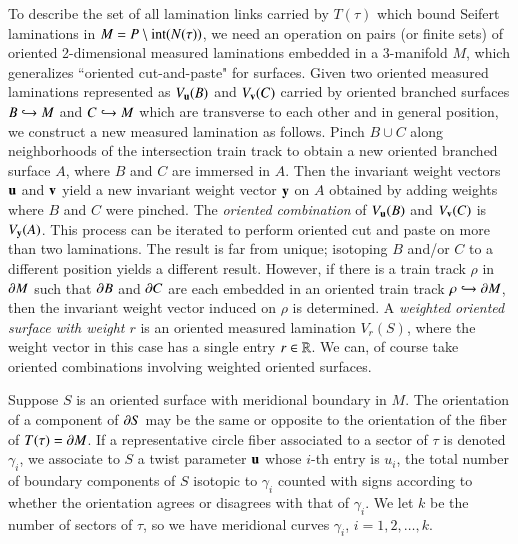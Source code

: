 \documentclass[12pt]{article}
\theoremstyle{remark}
\begin{document}
 To describe the set of all lamination links carried by $T(\tau)$ which bound Seifert laminations in $M=P\setminus {\rm int}(N(\tau))$, we need an operation on pairs (or finite sets) of oriented 2-dimensional measured laminations embedded in a 3-manifold $M$, which generalizes ``oriented cut-and-paste" for surfaces.    Given two oriented measured laminations represented as $V_{\bf u}(B)$ and $V_{\bf v}(C)$ carried by oriented branched surfaces $B\hookrightarrow M$ and $C\hookrightarrow M$ which are transverse to each other and in general position, we construct a new measured lamination as follows.  Pinch $B\cup C$ along neighborhoods of the intersection train track to obtain a new oriented branched surface $A$, where $B$ and $C$ are immersed in $A$.   Then the invariant weight vectors ${\bf u}$ and ${\bf v}$ yield a new invariant weight vector ${\bf y}$ on $A$ obtained by adding weights where $B$ and $C$ were pinched.  The {\it oriented combination} of $V_{\bf u}(B)$ and $V_{\bf v}(C)$ is $V_{\bf y}(A)$. This process can be iterated to perform oriented cut and paste on more than two laminations.  The result is far from unique;  isotoping $B$ and/or $C$ to a different position yields a different result.   However, if there is a train track $\rho$ in $\partial M$ such that $\partial B$ and $\partial C$ are each embedded in an oriented train track $\rho\hookrightarrow\partial M$, then the invariant weight vector induced on $\rho$ is determined.   A {\it weighted oriented surface with weight $r$} is an oriented measured lamination $V_r (S)$, where the weight vector in this case has a single entry $r\in \mathbb R$.   We can, of course take oriented combinations involving weighted oriented surfaces.
 

 
 
 Suppose $S$ is an oriented surface with meridional boundary in $M$.   The orientation of a component of $\partial S$ may be the same or opposite to the orientation of the fiber of $T(\tau)=\partial M$.   If a representative circle fiber associated to a sector of $\tau$ is denoted $\gamma_i$, we associate to $S$ a twist parameter ${\bf u}$ whose $i$-th entry is $u_i$, the total number of boundary components of $S$ isotopic to $\gamma_i$ counted with signs according to whether the orientation agrees or disagrees with that of $\gamma_i$.   We let $k$ be the number of sectors of $\tau$, so we have meridional curves $\gamma_i$, $i=1,2,\ldots,k$.  
 
\end{document}

